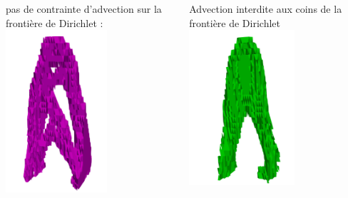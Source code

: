\documentclass{beamer}
\begin{document}
\begin{frame}
\begin{itemize}
			\begin{columns}
				\begin{column}{0.45\textwidth}
					pas de contrainte d'advection sur la frontière de Dirichlet :
					\includegraphics[width=0.6\textwidth]{elastSeule1}
				\end{column}
				\begin{column}{0.45\textwidth}
						Advection interdite aux coins de la frontière de Dirichlet
					\includegraphics[width=0.6\textwidth]{elastSeule2}
				\end{column}
			\end{columns}
			
		\end{itemize}
		
	\end{frame}
	
\end{document}
